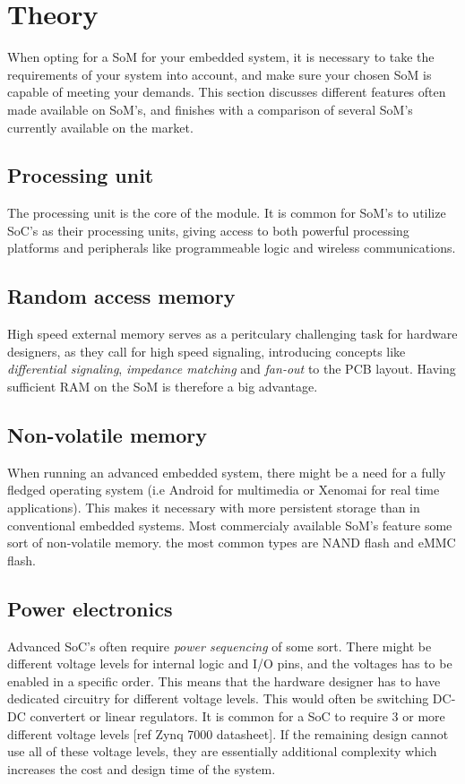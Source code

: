 \section{Theory}

When opting for a SoM for your embedded system, it is necessary to take the requirements of your system into account, and make sure your chosen SoM is capable of meeting your demands. This section discusses different features often made available on SoM's, and finishes with a comparison of several SoM's currently available on the market.

\subsection{Processing unit}

The processing unit is the core of the module. It is common for SoM's to utilize SoC's as their processing units, giving access to both powerful processing platforms and peripherals like programmeable logic and wireless communications.

\subsection{Random access memory}

High speed external memory serves as a peritculary challenging task for hardware designers, as they call for high speed signaling, introducing concepts like \emph{differential signaling}, \emph{impedance matching} and \emph{fan-out} to the PCB layout. Having sufficient RAM on the SoM is therefore a big advantage.

\subsection{Non-volatile memory}

When running an advanced embedded system, there might be a need for a fully fledged operating system (i.e Android for multimedia or Xenomai for real time applications). This makes it necessary with more persistent storage than in conventional embedded systems. Most commercialy available SoM's feature some sort of non-volatile memory. the most common types are NAND flash and eMMC flash.

\subsection{Power electronics}

Advanced SoC's often require \emph{power sequencing} of some sort. There might be different voltage levels for internal logic and I/O pins, and the voltages has to be enabled in a specific order. This means that the hardware designer has to have dedicated circuitry for different voltage levels. This would often be switching DC-DC convertert or linear regulators. It is common for a SoC to require 3 or more different voltage levels [ref Zynq 7000 datasheet]. If the remaining design cannot use all of these voltage levels, they are essentially additional complexity which increases the cost and design time of the system.

